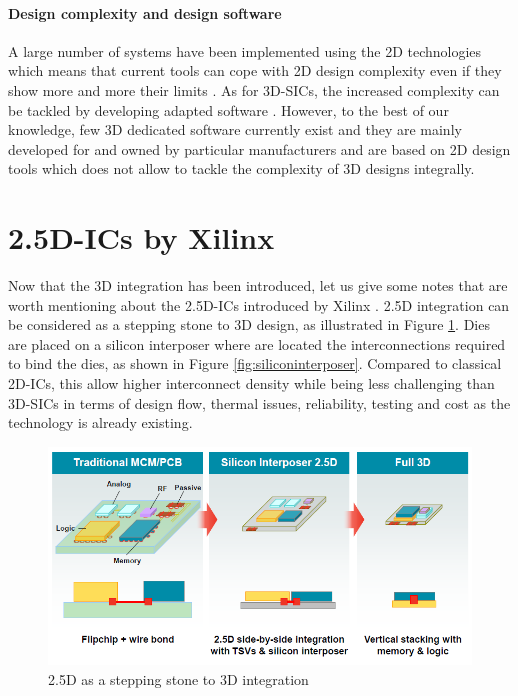 \paragraph{Design complexity and design software}
A large number of systems have been implemented using the 2D technologies which means that current tools can cope with 2D design complexity even if they show more and more their limits \cite{vanderbiest06, PFF10}. As for 3D-SICs, the increased complexity can be tackled by developing adapted software \cite{659500}. However, to the best of our knowledge, few 3D dedicated software currently exist and they are mainly developed for and owned by particular manufacturers and are based on 2D design tools which does not allow to tackle the complexity of 3D designs integrally.


\section{2.5D-ICs by Xilinx}
Now that the 3D integration has been introduced, let us give some notes that are worth mentioning about the 2.5D-ICs introduced by Xilinx \cite{bolsens2011}. 2.5D integration can be considered as a stepping stone to 3D design, as illustrated in Figure \ref{fig:2d5xilinx}. Dies are placed on a silicon interposer where are located the interconnections required to bind the dies, as shown in Figure \ref{fig:siliconinterposer}. Compared to classical 2D-ICs, this allow higher interconnect density while being less challenging than 3D-SICs in terms of design flow, thermal issues, reliability, testing and cost as the technology is already existing.

\begin{figure}[h!]
\begin{center}
\includegraphics[width=0.8\linewidth]{2d5xilinx}
\end{center}
\caption{2.5D as a stepping stone to 3D integration \cite{bolsens2011}}
\label{fig:2d5xilinx}
\end{figure}

